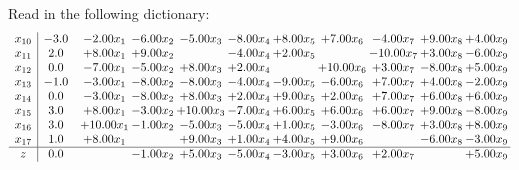 \documentclass[9pt]{article}
\begin{document}
Read in the following dictionary:
\[\begin{array}{c| c c@{\hskip 2pt} c@{\hskip 2pt} c@{\hskip 2pt} c@{\hskip 2pt} c@{\hskip 2pt} c@{\hskip 2pt} c@{\hskip 2pt} c@{\hskip 2pt} c@{\hskip 2pt} }
 x_{10}   &  -3.0 & -2.00 x_{1} & -6.00 x_{2} & -5.00 x_{3} & -8.00 x_{4} & +  8.00 x_{5} & +  7.00 x_{6} & -4.00 x_{7} & +  9.00 x_{8} & +  4.00 x_{9}\\
 x_{11}   &  2.0 & +  8.00 x_{1} & +  9.00 x_{2} &   & -4.00 x_{4} & +  2.00 x_{5} &   & -10.00 x_{7} & +  3.00 x_{8} & -6.00 x_{9}\\
 x_{12}   &  0.0 & -7.00 x_{1} & -5.00 x_{2} & +  8.00 x_{3} & +  2.00 x_{4} &   & + 10.00 x_{6} & +  3.00 x_{7} & -8.00 x_{8} & +  5.00 x_{9}\\
 x_{13}   &  -1.0 & -3.00 x_{1} & -8.00 x_{2} & -8.00 x_{3} & -4.00 x_{4} & -9.00 x_{5} & -6.00 x_{6} & +  7.00 x_{7} & +  4.00 x_{8} & -2.00 x_{9}\\
 x_{14}   &  0.0 & -3.00 x_{1} & -8.00 x_{2} & +  8.00 x_{3} & +  2.00 x_{4} & +  9.00 x_{5} & +  2.00 x_{6} & +  7.00 x_{7} & +  6.00 x_{8} & +  6.00 x_{9}\\
 x_{15}   &  3.0 & +  8.00 x_{1} & -3.00 x_{2} & + 10.00 x_{3} & -7.00 x_{4} & +  6.00 x_{5} & +  6.00 x_{6} & +  6.00 x_{7} & +  9.00 x_{8} & -8.00 x_{9}\\
 x_{16}   &  3.0 & + 10.00 x_{1} & -1.00 x_{2} & -5.00 x_{3} & -5.00 x_{4} & +  1.00 x_{5} & -3.00 x_{6} & -8.00 x_{7} & +  3.00 x_{8} & +  8.00 x_{9}\\
 x_{17}   &  1.0 & +  8.00 x_{1} &   & +  9.00 x_{3} & +  1.00 x_{4} & +  4.00 x_{5} & +  9.00 x_{6} &   & -6.00 x_{8} & -3.00 x_{9}\\
\hline
z    &  0.0  &   & -1.00 x_{2} & +  5.00 x_{3} & -5.00 x_{4} & -3.00 x_{5} & +  3.00 x_{6} & +  2.00 x_{7} &   & +  5.00 x_{9}\\
\end{array}\]
\end{document}
